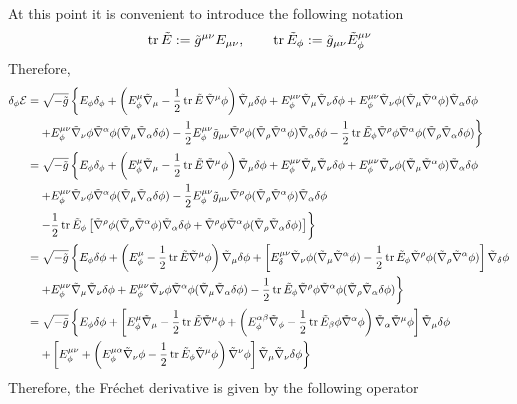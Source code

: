 At this point it is convenient to introduce the following notation
\begin{equation}
  \tr \tilde{E}:=\tilde{g}^{\mu\nu }E_{\mu\nu },\qquad \tr\tilde{E}_\phi :=\tilde{g}_{\mu\nu }\tilde{E}^{\mu\nu }_\phi 
\end{equation}
Therefore,
\begin{align*}
   \delta_\phi\mathcal{E} &=\sqrt{-\tilde{g}}\left\{E_\phi\delta_\phi+\left(E^\mu_\phi\tilde{\nabla}_\mu-\frac{1}{2}\tr\tilde{E }\, \tilde{\nabla}^\mu\phi \right)\tilde{\nabla}_\mu\delta\phi +E^{\mu\nu }_\phi \tilde{\nabla}_\mu\tilde{\nabla}_\nu \delta\phi +E^{\mu\nu }_\phi\tilde{\nabla}_\nu \phi(\tilde{\nabla}_\mu \tilde{\nabla}^\alpha\phi )\tilde{\nabla}_\alpha\delta\phi \right.\\
  &\left.\quad + E^{\mu\nu }_\phi\tilde{\nabla}_\nu\phi\tilde{\nabla}^\alpha \phi(\tilde{\nabla}_\mu\tilde{\nabla}_\alpha\delta\phi )-\frac{1}{2}E^{\mu\nu}_\phi \tilde{g}_{\mu\nu }\tilde{\nabla}^\rho\phi(\tilde{\nabla}_\rho\tilde{\nabla}^\alpha \phi )\tilde{\nabla}_\alpha\delta\phi  -\frac{1}{2}\tr \tilde{E}_\phi \tilde{\nabla}^\rho\phi\tilde{\nabla}^\alpha\phi(\tilde{\nabla}_\rho\tilde{\nabla}_\alpha\delta\phi )\right\}\\
  &=\sqrt{-\tilde{g}}\left\{E_\phi\delta_\phi+\left(E^\mu_\phi\tilde{\nabla}_\mu-\frac{1}{2}\tr\tilde{E }\, \tilde{\nabla}^\mu\phi \right)\tilde{\nabla}_\mu\delta\phi +E^{\mu\nu }_\phi \tilde{\nabla}_\mu\tilde{\nabla}_\nu \delta\phi +E^{\mu\nu }_\phi\tilde{\nabla}_\nu \phi(\tilde{\nabla}_\mu \tilde{\nabla}^\alpha\phi )\tilde{\nabla}_\alpha\delta\phi \right.\\
  &\left.\quad + E^{\mu\nu }_\phi\tilde{\nabla}_\nu\phi\tilde{\nabla}^\alpha \phi(\tilde{\nabla}_\mu\tilde{\nabla}_\alpha\delta\phi )-\frac{1}{2}E^{\mu\nu}_\phi \tilde{g}_{\mu\nu }\tilde{\nabla}^\rho\phi(\tilde{\nabla}_\rho\tilde{\nabla}^\alpha \phi )\tilde{\nabla}_\alpha\delta\phi \right.\\
   &\left.\quad  -\frac{1}{2}\tr\tilde{E}_\phi \left[\tilde{\nabla}^\rho\phi (\tilde{\nabla}_\rho\tilde{\nabla}^\alpha\phi )\tilde{\nabla}_\alpha\delta\phi +\tilde{\nabla}^\rho\phi\tilde{\nabla}^\alpha\phi (\tilde{\nabla}_\rho\tilde{\nabla}_\alpha\delta\phi )\right]\right\}\\
   &=\sqrt{-\tilde{g}}\left\{E_\phi\delta\phi +\left(E^\mu_\phi-\frac{1}{2}\tr \tilde{E}\tilde{\nabla}^\mu\phi \right)\tilde{\nabla}_\mu\delta\phi +\left[E^{\mu\nu }_\delta\tilde{\nabla}_\nu\phi (\tilde{\nabla}_\mu\tilde{\nabla}^\alpha\phi )-\frac{1}{2}\tr \tilde{E}_\phi \tilde{\nabla}^\rho\phi (\tilde{\nabla}_\rho\tilde{\nabla}^\alpha\phi )\right]\tilde{\nabla}_\delta\phi\right. \\
   &\left. \quad +E^{\mu\nu }_\phi\tilde{\nabla}_\mu\tilde{\nabla}_\nu \delta\phi +E^{\mu\nu }_\phi\tilde{\nabla}_\nu\phi\tilde{\nabla}^\alpha\phi (\tilde{\nabla}_\mu\tilde{\nabla}_\alpha\delta\phi )-\frac{1}{2}\tr \tilde{E}_\phi \tilde{\nabla}^\rho\phi\tilde{\nabla}^\alpha\phi (\tilde{\nabla}_\rho\tilde{\nabla}_\alpha\delta\phi )\right\}\\
    &=\sqrt{-\tilde{g}}\left\{E_\phi\delta\phi +\left[E^\mu_\phi \tilde{\nabla}_\mu-\frac{1}{2}\tr\tilde{E}\tilde{\nabla}^\mu\phi +\left(E^{\alpha\beta }_\phi\tilde{\nabla}_\phi-\frac{1}{2}\tr \tilde{E}_\beta\phi \tilde{\nabla}^\alpha\phi \right)\tilde{\nabla}_\alpha\tilde{\nabla}^\mu\phi \right]\tilde{\nabla}_\mu\delta\phi\right.\\
    &\quad \left.+\left[E^{\mu\nu }_\phi+\left(E^{\mu\alpha }_\phi \tilde{\nabla}_\nu\phi-\frac{1}{2}\tr\tilde{E}_\phi \tilde{\nabla}^\mu\phi \right)\tilde{\nabla}^\nu\phi \right]\tilde{\nabla}_\mu\tilde{\nabla}_\nu\delta\phi  \right\}
\end{align*}
Therefore, the Fréchet derivative is given by the following operator

